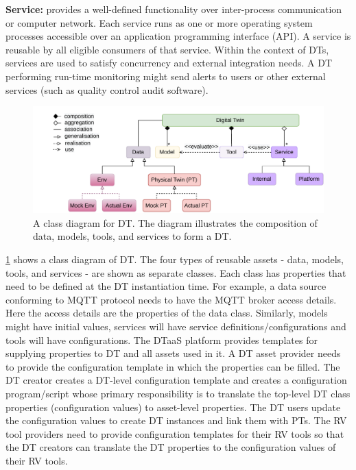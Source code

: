 \textbf{Service:} provides a well-defined functionality over inter-process communication or computer network. Each service runs as one or more operating system processes accessible over an application programming interface (API). A service is reusable by all eligible consumers of that service. Within the context of DTs, services are used to satisfy concurrency and external integration needs. A DT performing run-time monitoring might send alerts to users or other external services (such as quality control audit software).

%
\begin{figure}[]
	\centering
	\includegraphics[width=\columnwidth]{images/assets-relationship.pdf}
	\caption{A class diagram for DT. The diagram illustrates the composition of data, models, tools, and services to form a DT. }
	\label{fig:dt-class-diagram}
\end{figure}%
%
\cref{fig:dt-class-diagram} shows a class diagram of DT. The four types of reusable assets - data, models, tools, and services - are shown as separate classes. Each class has properties that need to be defined at the DT instantiation time. For example, a data source conforming to MQTT protocol needs to have the MQTT broker access details. Here the access details are the properties of the data class. Similarly, models might have initial values, services will have service definitions/configurations and tools will have configurations. The DTaaS platform provides templates for supplying properties to DT and all assets used in it. A DT asset provider needs to provide the configuration template in which the properties can be filled.
The DT creator creates a DT-level configuration template and creates a configuration program/script whose primary responsibility is to translate the top-level DT class properties (configuration values) to asset-level properties. The DT users update the configuration values to create DT instances and link them with PTs.
The RV tool providers need to provide configuration templates for their RV tools so that the DT creators can translate the DT properties to the configuration values of their RV tools.

